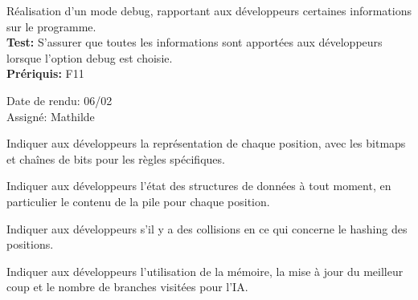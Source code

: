 \documentclass{article}
\begin{document}
\begin{needbox}
    Réalisation d'un mode debug, rapportant aux développeurs certaines informations sur le programme.\\
    \textbf{Test:} S'assurer que toutes les informations sont apportées aux développeurs lorsque l'option
    debug est choisie.\\
    \textbf{Prériquis:} F11
    \begin{duedatebox}
        Date de rendu: 06/02\\
        Assigné: Mathilde
    \end{duedatebox}
    \begin{subneedbox}
        Indiquer aux développeurs la représentation de chaque position, avec les bitmaps et chaînes de bits pour les
        règles spécifiques.
    \end{subneedbox}
    \begin{subneedbox}
        Indiquer aux développeurs l'état des structures de données à tout moment, en particulier le contenu de la pile pour chaque position.
    \end{subneedbox}
    \begin{subneedbox}
        Indiquer aux développeurs s'il y a des collisions en ce qui concerne le hashing des positions.
    \end{subneedbox}
    \begin{subneedbox}[F19.4: IA]
        Indiquer aux développeurs l'utilisation de la mémoire, la mise à jour du meilleur coup et le nombre de branches visitées pour l'IA.
    \end{subneedbox}
\end{needbox}
\end{document}
